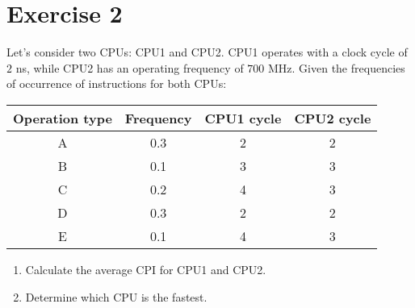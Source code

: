 \section{Exercise 2}

Let's consider two CPUs: CPU1 and CPU2.
CPU1 operates with a clock cycle of $2$ ns, while CPU2 has an operating frequency of $700$ MHz.
Given the frequencies of occurrence of instructions for both CPUs:
\begin{table}[H]
    \centering
    \begin{tabular}{cccc}
    \hline
    \textbf{Operation type} & \textbf{Frequency} & \textbf{CPU1 cycle} & \textbf{CPU2 cycle} \\ \hline
    A                       & 0.3                & 2                   & 2                   \\
    B                       & 0.1                & 3                   & 3                   \\
    C                       & 0.2                & 4                   & 3                   \\
    D                       & 0.3                & 2                   & 2                   \\
    E                       & 0.1                & 4                   & 3                   \\ \hline
    \end{tabular}
\end{table}
\begin{enumerate}
    \item Calculate the average CPI for CPU1 and CPU2.
    \item Determine which CPU is the fastest.
\end{enumerate}

